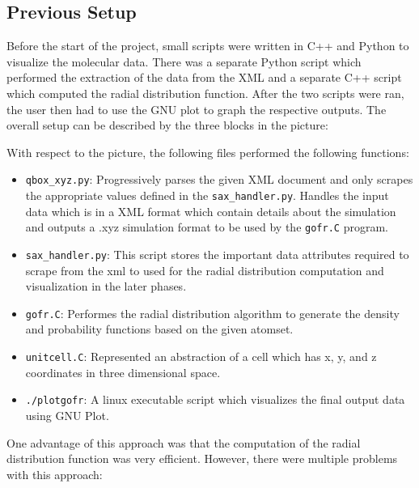 
\subsection*{Previous Setup}

Before the start of the project, small scripts were written in C++ and Python to visualize the molecular data. There was a separate Python script which performed the extraction of the data from the XML and a separate C++ script which computed the radial distribution function. After the two scripts were ran, the user then had to use the GNU plot to graph the respective outputs. The overall setup can be described by the three blocks in the picture:





With respect to the picture, the following files performed the following functions: 

\begin{itemize}
        
    \item \verb|qbox_xyz.py|: Progressively parses the given XML document and only scrapes the appropriate values defined in the \verb|sax_handler.py|. Handles the input data which is in a XML format which contain details about the simulation and outputs a .xyz simulation format to be used by the \verb|gofr.C| program.
    
    \item \verb|sax_handler.py|: This script stores the important data attributes required to scrape from the xml to used for the radial distribution computation and visualization in the later phases.

    \item \verb|gofr.C|: Performes the radial distribution algorithm to generate the density and probability functions based on the given atomset.
    
    \item \verb|unitcell.C|: Represented an abstraction of a cell which has x, y, and z coordinates in three dimensional space.
    
    \item \verb|./plotgofr|: A linux executable script which visualizes the final output data using GNU Plot.
    
\end{itemize}





One advantage of this approach was that the computation of the radial distribution function was very efficient. However, there were multiple problems with this approach:

